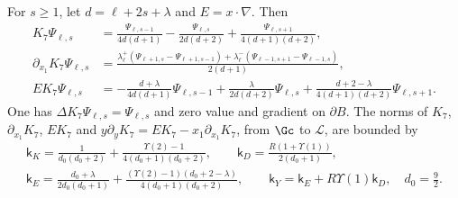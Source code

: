 \begin{lemma}\label{r7:lem-K}
For $s\geq1$, let $d=\ell+2s+\lambda$ and $E=x\cdot\nabla$. Then
\begin{align*}
K_7\Psi_{\ell,s}&=\frac{\Psi_{\ell,s-1}}{4d(d+1)}-\frac{\Psi_{\ell,s}}{2d(d+2)}+\frac{\Psi_{\ell,s+1}}{4(d+1)(d+2)},\\
\partial_{x_1}K_7\Psi_{\ell,s}&=\frac{\lambda^+_\ell(\Psi_{\ell+1,s}-\Psi_{\ell+1,s-1})+\lambda^-_\ell(\Psi_{\ell-1,s+1}-\Psi_{\ell-1,s})}{2(d+1)},\\
EK_7\Psi_{\ell,s}&=-\frac{d+\lambda}{4d(d+1)}\Psi_{\ell,s-1}+\frac\lambda{2d(d+2)}\Psi_{\ell,s}+\frac{d+2-\lambda}{4(d+1)(d+2)}\Psi_{\ell,s+1}.
\end{align*}
One has $\Delta K_7\Psi_{\ell,s}=\Psi_{\ell,s}$ and zero value and gradient on $\partial B$. The norms of $K_7$, $\partial_{x_1}K_7$, $EK_7$ and $y\partial_yK_7=EK_7-x_1\partial_{x_1}K_7$, from $\Gc$ to $\mathcal L$, are bounded by
\begin{gather*}
\mathsf k_K=\frac1{d_0(d_0+2)}+\frac{\Upsilon(2)-1}{4(d_0+1)(d_0+2)},\qquad
\mathsf k_D=\frac{R(1+\Upsilon(1))}{2(d_0+1)},\\
\mathsf k_E=\frac{d_0+\lambda}{2d_0(d_0+1)}+\frac{(\Upsilon(2)-1)(d_0+2-\lambda)}{4(d_0+1)(d_0+2)},\qquad
\mathsf k_Y=\mathsf k_E+R\Upsilon(1)\mathsf k_D,\quad d_0=\frac92.
\end{gather*}
\end{lemma}
